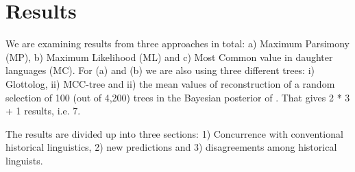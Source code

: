 \documentclass[12pt,letterpaper]{article}
\begin{document}



\FloatBarrier
\section{Results}
We are examining results from three approaches in total: a) Maximum Parsimony (MP), b) Maximum Likelihood (ML) and c) Most Common value in daughter languages (MC). For (a) and (b) we are also using three different trees: i) Glottolog, ii) \citet{grayetal_2009} MCC-tree and ii) the mean values of reconstruction of a random selection of 100 (out of 4,200) trees in the Bayesian posterior of \citet{grayetal_2009}. That gives 2 * 3 + 1 results, i.e. 7.

The results are divided up into three sections: 1) Concurrence with conventional historical linguistics, 2) new predictions and 3) disagreements among historical linguists.
\end{document}
